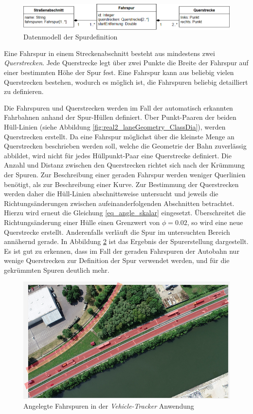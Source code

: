 \begin{figure}[H]
    \centering
    \includegraphics[align=c, width=0.85\linewidth]{resources/img/umsetzung/U2/Fahrspurmodell}
    \caption{Datenmodell der Spurdefinition}
    \label{fig:real2_lane_datamodell}
\end{figure}

Eine Fahrspur in einem Streckenabschnitt besteht aus mindestens zwei \textit{Querstrecken}. Jede Querstrecke
legt über zwei Punkte die Breite der Fahrspur auf einer bestimmten Höhe der Spur fest. Eine Fahrspur
kann aus beliebig vielen Querstrecken bestehen, wodurch es möglich ist, die Fahrspuren beliebig detailliert
zu definieren.

Die Fahrspuren und Querstrecken werden im Fall der automatisch erkannten Fahrbahnen anhand der Spur-Hüllen
definiert. Über Punkt-Paaren der beiden Hüll-Linien (siehe Abbildung \ref{fig:real2_laneGeometry_ClassDia}),
werden Querstrecken erstellt.
Da eine Fahrspur möglichst über die kleinste Menge an Querstrecken beschrieben werden soll, welche die
Geometrie der Bahn zuverlässig abbildet, wird nicht für jedes Hüllpunkt-Paar eine Querstrecke definiert.
Die Anzahl und Distanz zwischen den Querstrecken richtet sich nach der Krümmung der Spuren. Zur Beschreibung
einer geraden Fahrspur werden weniger Querlinien benötigt, als zur Beschreibung einer Kurve.
Zur Bestimmung der Querstrecken werden daher die Hüll-Linien abschnittsweise untersucht und jeweils
die Richtungsänderungen zwischen aufeinanderfolgenden Abschnitten betrachtet. Hierzu wird erneut
die Gleichung \ref{eq_angle_skalar} eingesetzt.
Überschreitet die Richtungsänderung einer Hülle einen Grenzwert von $\phi = 0.02$, so wird eine neue
Querstrecke erstellt. Anderenfalls verläuft die Spur im untersuchten Bereich annähernd gerade.
In Abbildung \ref{fig:real2_lanes_trackerApplication} ist das Ergebnis der Spurerstellung dargestellt.
Es ist gut zu erkennen, dass im Fall der geraden Fahrspuren der Autobahn nur wenige Querstrecken zur
Definition der Spur verwendet werden, und für die gekrümmten Spuren deutlich mehr.

\begin{figure}[H]
    \centering
    \includegraphics[align=c, width=0.6\linewidth]{resources/img/umsetzung/U2/LaneCreator_Example}
    \caption{Angelegte Fahrspuren in der \textit{Vehicle-Tracker} Anwendung}
    \label{fig:real2_lanes_trackerApplication}
\end{figure}


